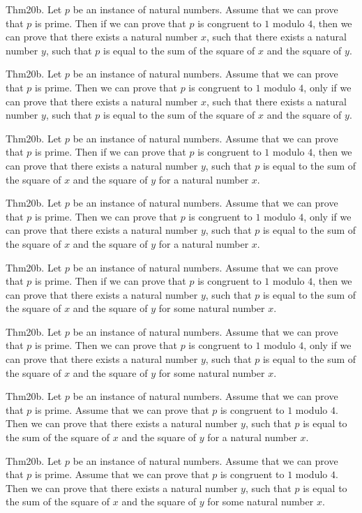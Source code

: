 \documentclass{article}
\begin{document}
Thm20b. Let $p$ be an instance of natural numbers. Assume that we can prove that $p$ is prime. Then if we can prove that $p$ is congruent to $1$ modulo $4$, then we can prove that there exists a natural number $x$, such that there exists a natural number $y$, such that $p$ is equal to the sum of the square of $x$ and the square of $y$.

Thm20b. Let $p$ be an instance of natural numbers. Assume that we can prove that $p$ is prime. Then we can prove that $p$ is congruent to $1$ modulo $4$, only if we can prove that there exists a natural number $x$, such that there exists a natural number $y$, such that $p$ is equal to the sum of the square of $x$ and the square of $y$.

Thm20b. Let $p$ be an instance of natural numbers. Assume that we can prove that $p$ is prime. Then if we can prove that $p$ is congruent to $1$ modulo $4$, then we can prove that there exists a natural number $y$, such that $p$ is equal to the sum of the square of $x$ and the square of $y$ for a natural number $x$.

Thm20b. Let $p$ be an instance of natural numbers. Assume that we can prove that $p$ is prime. Then we can prove that $p$ is congruent to $1$ modulo $4$, only if we can prove that there exists a natural number $y$, such that $p$ is equal to the sum of the square of $x$ and the square of $y$ for a natural number $x$.

Thm20b. Let $p$ be an instance of natural numbers. Assume that we can prove that $p$ is prime. Then if we can prove that $p$ is congruent to $1$ modulo $4$, then we can prove that there exists a natural number $y$, such that $p$ is equal to the sum of the square of $x$ and the square of $y$ for some natural number $x$.

Thm20b. Let $p$ be an instance of natural numbers. Assume that we can prove that $p$ is prime. Then we can prove that $p$ is congruent to $1$ modulo $4$, only if we can prove that there exists a natural number $y$, such that $p$ is equal to the sum of the square of $x$ and the square of $y$ for some natural number $x$.

Thm20b. Let $p$ be an instance of natural numbers. Assume that we can prove that $p$ is prime. Assume that we can prove that $p$ is congruent to $1$ modulo $4$. Then we can prove that there exists a natural number $y$, such that $p$ is equal to the sum of the square of $x$ and the square of $y$ for a natural number $x$.

Thm20b. Let $p$ be an instance of natural numbers. Assume that we can prove that $p$ is prime. Assume that we can prove that $p$ is congruent to $1$ modulo $4$. Then we can prove that there exists a natural number $y$, such that $p$ is equal to the sum of the square of $x$ and the square of $y$ for some natural number $x$.
\end{document}
